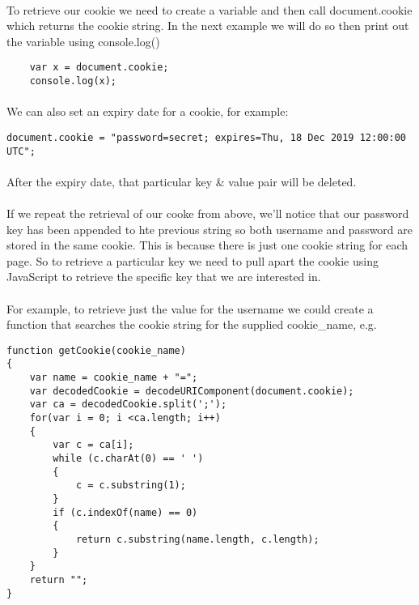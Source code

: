 \documentclass[10pt, a4paper, twosize]{article}
\begin{document}
\paragraph{} To retrieve our cookie we need to create a variable and then call document.cookie which returns the cookie string. In the next example we will do so then print out the variable using console.log()
\begin{lstlisting}
    var x = document.cookie;
    console.log(x);
\end{lstlisting}
\paragraph{} We can also set an expiry date for a cookie, for example:

\begin{lstlisting}
document.cookie = "password=secret; expires=Thu, 18 Dec 2019 12:00:00 UTC"; 
\end{lstlisting}

\paragraph{} After the expiry date, that particular key \& value pair will be deleted.

\paragraph{} If we repeat the retrieval of our cooke from above, we'll notice that our password key has been appended to hte previous string so both username and password are stored in the same cookie. This is because there is just one cookie string for each page. So to retrieve a particular key we need to pull apart the cookie using JavaScript to retrieve the specific key that we are interested in.

\paragraph{} For example, to retrieve just the value for the username we could create a function that searches the cookie string for the supplied cookie\_name, e.g.
\begin{lstlisting}
function getCookie(cookie_name)
{
    var name = cookie_name + "=";
    var decodedCookie = decodeURIComponent(document.cookie);
    var ca = decodedCookie.split(';');
    for(var i = 0; i <ca.length; i++)
    {
        var c = ca[i];
        while (c.charAt(0) == ' ') 
        {
            c = c.substring(1);
        }
        if (c.indexOf(name) == 0) 
        {
            return c.substring(name.length, c.length);
        }
    }
    return "";
}
\end{lstlisting}
\end{document}
